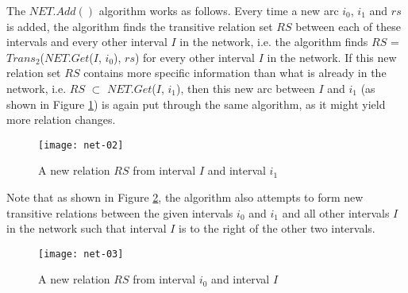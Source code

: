 \documentclass[11pt]{report}
\begin{document}
          The $NET.Add()$ algorithm works as follows. Every time a new arc
          $i_0$, $i_1$ and $rs$ is added, the algorithm finds the transitive
          relation set $RS$ between each of these intervals and every other
          interval $I$ in the network, i.e. the algorithm finds $RS$ =
          $Trans_2$($NET.Get$($I$, $i_0$), $rs$) for every other interval $I$
          in the network. If this new relation set $RS$ contains more specific
          information than what is already in the network, i.e. $RS$ $\subset$
          $NET.Get$($I$, $i_1$), then this new arc between $I$ and $i_1$ (as
          shown in Figure \ref{fig-net-ex-02}) is again put through the same
          algorithm, as it might yield more relation changes.

          \begin{figure}[[tbhp]
            \begin{center}
              \texttt{[image: net-02]}
              \caption{A new relation $RS$ from interval $I$ and interval $i_1$}
              \label{fig-net-ex-02}
            \end{center}
          \end{figure}

          Note that as shown in Figure \ref{fig-net-ex-03}, the algorithm also
          attempts to form new transitive relations between the given intervals
          $i_0$ and $i_1$ and all other intervals $I$ in the network such that
          interval $I$ is to the right of the other two intervals.

          \begin{figure}[[tbhp]
            \begin{center}
              \texttt{[image: net-03]}
              \caption{A new relation $RS$ from interval $i_0$ and interval $I$}
              \label{fig-net-ex-03}
            \end{center}
          \end{figure}
\end{document}
